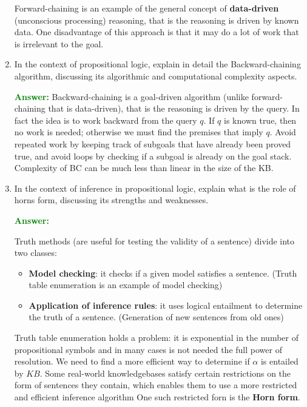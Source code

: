 \documentclass[12pt]{article}
\begin{document}
\begin{enumerate}[label=\textbf{PL.\arabic*}]
    Forward-chaining is an example of the general concept of \textbf{data-driven} (unconscious processing) reasoning, that is the reasoning is driven by known data.
    One disadvantage of this approach is that it may do a lot of work that is irrelevant to the goal.

    \item In the context of propositional logic, explain in detail the Backward-chaining algorithm, discussing its algorithmic and computational complexity aspects.
    
    \textcolor{green}{\textbf{Answer:}}
    Backward-chaining is a goal-driven algorithm (unlike forward-chaining that is data-driven), that is the reasoning is driven by the query.
    In fact the idea is to work backward from the query $q$.
    If $q$ is known true, then no work is needed; otherwise we must find the premises that imply $q$.
    Avoid repeated work by keeping track of subgoals that have already been proved true, 
    and avoid loops by checking if a subgoal is already on the goal stack.
    Complexity of BC can be much less than linear in the size of the KB\@.
    \item In the context of inference in propositional logic, explain what is the role of horns form, discussing its strengths and weaknesses.
    
    \textcolor{green}{\textbf{Answer:}}
    
    Truth methods (are useful for testing the validity of a sentence) divide into two classes:
    \begin{itemize}
        \item \textbf{Model checking}: it checks if a given model satisfies a sentence. (Truth table enumeration is an example of model checking)
        \item \textbf{Application of inference rules}: it uses logical entailment to determine the truth of a sentence. (Generation of new sentences from old ones)
    \end{itemize}

    Truth table enumeration holds a problem: it is exponential in the number of propositional symbols and in many cases is not needed the full power of resolution.
    We need to find a more efficient way to determine if $\alpha$ is entailed by $KB$.
    Some real-world knowledgebases satisfy certain restrictions on the form of sentences  they contain, 
    which enables them to use a more restricted and efficient inference algorithm
    One such restricted forn is the \textbf{Horn form}.


\end{enumerate}
\end{document}
